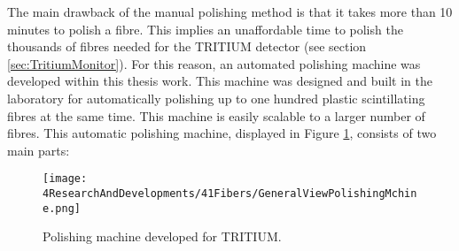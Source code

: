 The main drawback of the manual polishing method is that it takes more than 10 minutes to polish a fibre. This implies an unaffordable time to polish the thousands of fibres needed for the TRITIUM detector (see section \ref{sec:TritiumMonitor}). For this reason, an automated polishing machine was developed within this thesis work. This machine was designed and built in the laboratory for automatically polishing up to one hundred plastic scintillating fibres at the same time. This machine is easily scalable to a larger number of fibres. This automatic polishing machine, displayed in Figure \ref{fig:GeneralViewPolishingMachine}, consists of two main parts:

\begin{figure}[h]
\centering
\texttt{[image: 4ResearchAndDevelopments/41Fibers/GeneralViewPolishingMchine.png]}
\caption{Polishing machine developed for TRITIUM.\label{fig:GeneralViewPolishingMachine}}
\end{figure}

